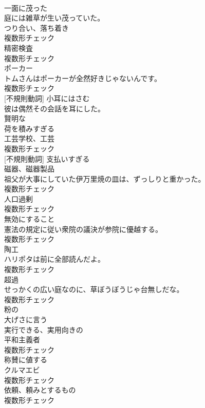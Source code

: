 \documentclass[8pt]{extreport}
\begin{document}
\begin{CJK}{UTF8}{min}
\\	[形容詞]	一面に茂った	
\\	庭には雑草が生い茂っていた。	
\\	[名詞]	つり合い、落ち着き	
\\	複数形チェック
\\	[名詞]	精密検査	
\\	複数形チェック
\\	[名詞]	ポーカー	
\\	トムさんはポーカーが全然好きじゃないんです。	
\\	複数形チェック
\\	[動詞] [不規則動詞]	小耳にはさむ	
\\	彼は偶然その会話を耳にした。	
\\	[形容詞]	賢明な	
\\	[動詞]	荷を積みすぎる	
\\	[名詞]	工芸学校、工芸	
\\	複数形チェック
\\	[動詞] [不規則動詞]	支払いすぎる	
\\	[名詞]	磁器、磁器製品	
\\	祖父が大事にしていた伊万里焼の皿は、ずっしりと重かった。	
\\	複数形チェック
\\	[名詞]	人口過剰	
\\	複数形チェック
\\	[名詞]	無効にすること	
\\	憲法の規定に従い衆院の議決が参院に優越する。	
\\	複数形チェック
\\	[名詞]	陶工	
\\	ハリポタは前に全部読んだよ。	
\\	複数形チェック
\\	[名詞]	超過	
\\	せっかくの広い庭なのに、草ぼうぼうじゃ台無しだな。	
\\	複数形チェック
\\	[形容詞]	粉の	
\\	[動詞]	大げさに言う	
\\	[形容詞]	実行できる、実用向きの	
\\	[名詞]	平和主義者	
\\	複数形チェック
\\	[形容詞]	称賛に値する	
\\	[名詞]	クルマエビ	
\\	複数形チェック
\\	[名詞]	依頼、頼みとするもの	
\\	複数形チェック

\end{CJK}
\end{document}
